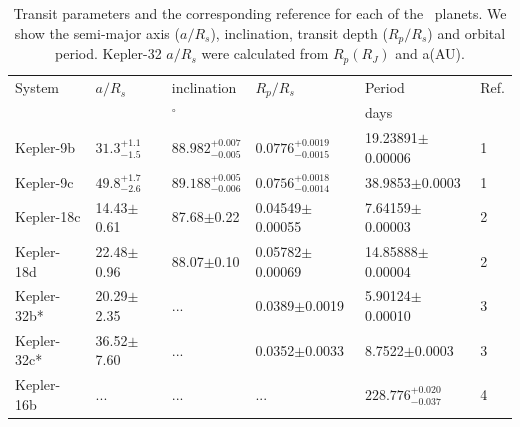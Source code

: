 
\begin{table}
\caption{Transit parameters and the corresponding reference for each of the \Kepler~planets. We show the semi-major axis ($a/R_s$), inclination, transit depth ($R_p/R_s$) and orbital period. Kepler-32 $a/R_s$ were calculated from $R_p(R_J)$ and a(AU). \label{P4:tab:transit}}
\centering
\begin{tabular}{llllll}
    \hline\hline
    System & $a/R_s$ & inclination & $R_p/R_s$ & Period & Ref. \\
     &  & $^{\circ}$ &  & days &  \\
    \hline
    Kepler-9b &  $31.3^{+1.1}_{-1.5}$  & $88.982^{+0.007}_{-0.005}$  &  $0.0776^{+0.0019}_{-0.0015}$ & 19.23891$\pm$0.00006 & 1 \\
    Kepler-9c &  $49.8^{+1.7}_{-2.6}$  & $89.188^{+0.005}_{-0.006}$  &  $0.0756^{+0.0018}_{-0.0014}$ & 38.9853$\pm$0.0003 & 1 \\
    Kepler-18c &  14.43$\pm$0.61  & 	87.68$\pm$0.22  &  0.04549$\pm$0.00055 & 7.64159$\pm$0.00003 & 2 \\
    Kepler-18d &  22.48$\pm$0.96  & 	88.07$\pm$0.10  &  0.05782$\pm$0.00069 & 	14.85888$\pm$0.00004 & 2 \\
    Kepler-32b* &  20.29$\pm$2.35 &  ... & 0.0389$\pm$0.0019 & 5.90124$\pm$0.00010	 & 3 \\
    Kepler-32c* &  36.52$\pm$7.60 &  ... & 0.0352$\pm$0.0033 & 8.7522$\pm$0.0003 & 3 \\
    Kepler-16b & ... & ... & ... & $228.776_{-0.037}^{+0.020}$ & 4 \\
    \hline
\end{tabular}
\end{table}


